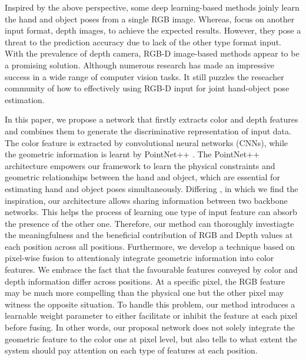 Inspired by the above perspective, some deep learning-based methods \cite{hasson2019learning, hasson2020leveraging, tekin2019h+, tse2022collaborative, liu2021semi, oikonomidis2011full, lu2021understanding, hasson2021towards, wang2020learning} joinly learn the hand and object poses from a single RGB image. Whereas, \cite{choi2017robust, zhang2021single, goudie20173d, oberweger2019generalized} focus on another input format, depth images, to achieve the expected results. However, they pose a threat to the prediction accuracy due to lack of the other type format input. With the prevalence of depth camera, RGB-D image-based methods \cite{kyriazis2013physically, tsoli2018joint} appear to be a promising solution. Although numerous research has made an impressive success in a wide range of computer vision tasks. It still puzzles the reseacher community of how to effectively using RGB-D input for joint hand-object pose estimation.

In this paper, we propose a network that firstly extracts color and depth features and combines them to generate the discriminative representation of input data. The color feature is extracted by convolutional neural networks (CNNs), while the geometric information is learnt by PointNet++ \cite{qi2017pointnet++}. The PointNet++ architecture empowers our framework to learn the physical constraints and geometric relationships between the hand and object, which are essential for estimating hand and object poses simultaneously. Differing \cite{ding2019votenet}, in which we find the inspiration, our architecture allows sharing information between two backbone networks. This helps the process of learning one type of input feature can absorb the presence of the other one. Therefore, our method can thoroughly investiagte the meaningfulness and the beneficial contribution of RGB and Depth values at each position across all positions. Furthermore, we develop a technique based on pixel-wise fusion \cite{wang2019densefusion} to attentionaly integrate geometric information into color features. We embrace the fact that the favourable features conveyed by color and depth information differ across positions. At a specific pixel, the RGB feature may be much more compelling than the physical one but the other pixel may witness the opposite  situation. To handle this problem, our method introduces a learnable weight parameter to either facilitate or inhibit the feature at each pixel before fusing. In other words, our proposal network does not solely integrate the geometric feature to the color one at pixel level, but also tells to what extent the system should pay attention on each type of features at each position. 

